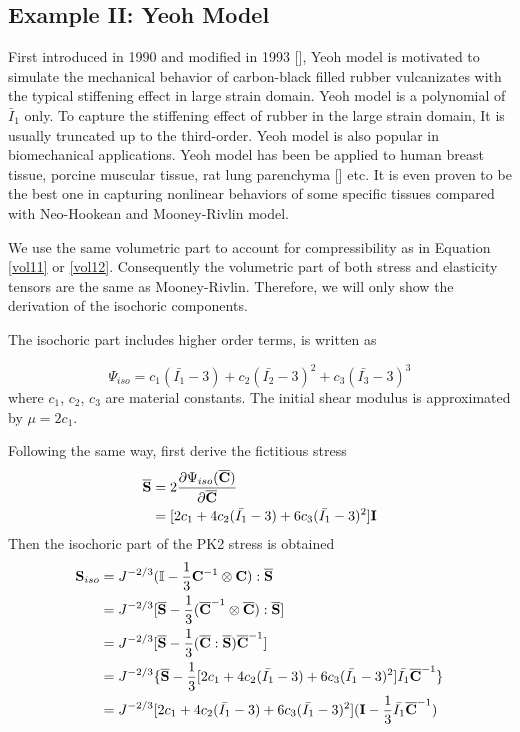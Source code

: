 %
\subsection{Example II: Yeoh Model}
First introduced in 1990 and modified in 1993 [], Yeoh model is motivated to simulate the mechanical behavior of carbon-black filled rubber vulcanizates with the typical stiffening effect in large strain domain. Yeoh model is a polynomial of $\bar{I}_1$ only.  To capture the stiffening effect of rubber in the large strain domain, It is usually truncated up to the third-order. Yeoh model is also popular in biomechanical applications. Yeoh model has been be applied to human breast tissue, porcine muscular tissue, rat lung parenchyma [] etc. It is even proven to be the best one in capturing nonlinear behaviors of some specific tissues compared with Neo-Hookean and Mooney-Rivlin model.

We use the same volumetric part to account for compressibility as in Equation \ref{vol11} or \ref{vol12}. Consequently the volumetric part of both stress and elasticity tensors are the same as Mooney-Rivlin. Therefore, we will only show the derivation of the isochoric components.

The isochoric part includes higher order terms, is written as

\begin{equation} \label{iso2}
\Psi_{iso} = c_1(\bar{I_1} - 3) + c_2(\bar{I_2} - 3)^2 + c_3(\bar{I_3} - 3)^3
\end{equation}
where $c_1$, $c_2$, $c_3$ are material constants. The initial shear modulus is approximated by $\mu = 2c_1$.

Following the same way, first derive the fictitious stress
\begin{equation} \label{Sbar2}
\begin{split}
\overline{\bold{S}} &= 2\frac{\partial\Psi_{iso}({\overline{\bold{C}})}}{\partial\overline{\bold{C}}} \\
&= [2c_1 + 4c_2(\bar{I_1} - 3) + 6c_3(\bar{I_1} - 3)^2] \bold{I} \\
\end{split}
\end{equation}
Then the isochoric part of the PK2 stress is obtained
\begin{equation} \label{Siso2}
\begin{split}
{\bold{S}}_{iso} &= J^{-2/3}(\mathbb{I} - \frac{1}{3}\bold{C}^{-1} \otimes \bold{C}) : \overline{\bold{S}}\\
&= J^{-2/3} [\overline{\bold{S}} - \frac{1}{3}({\overline{\bold{C}}}^{-1} \otimes  {\overline{\bold{C}}}) :  \overline{\bold{S}}] \\
&= J^{-2/3}[\overline{\bold{S}} - \frac{1}{3} (\overline{\bold{C}} : \overline{\bold{S}}) \overline{\bold{C}}^{-1}  ] \\
&= J^{-2/3}\{\overline{\bold{S}} - \frac{1}{3} [2c_1 + 4c_2(\bar{I_1} - 3) + 6c_3(\bar{I_1} - 3)^2] \bar{I_1}\overline{\bold{C}}^{-1} \}\\
&= J^{-2/3}[2c_1 + 4c_2(\bar{I_1} - 3) + 6c_3(\bar{I_1} - 3)^2] (\bold{I} - \frac{1}{3}\bar{I_1}{\overline{\bold{C}}}^{-1})
\end{split}
\end{equation}

